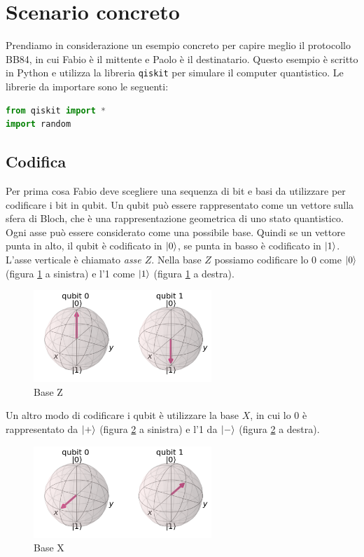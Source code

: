 \documentclass[a4paper]{article}
\begin{document}
\section{Scenario concreto}
Prendiamo in considerazione un esempio concreto per capire meglio il protocollo BB84,
in cui Fabio è il mittente e Paolo è il destinatario. Questo esempio è scritto in Python
e utilizza la libreria \texttt{qiskit} per simulare il computer quantistico. Le librerie
da importare sono le seguenti:
\begin{lstlisting}[language=Python]
from qiskit import *
import random
\end{lstlisting}

\subsection{Codifica}
Per prima cosa Fabio deve scegliere una sequenza di bit e basi da utilizzare per
codificare i bit in qubit. Un qubit può essere rappresentato come un vettore sulla sfera
di Bloch, che è una rappresentazione geometrica di uno stato quantistico. Ogni asse
può essere considerato come una possibile base. Quindi se un vettore punta in alto, il
qubit è codificato in $\ket{0}$, se punta in basso è codificato in $\ket{1}$. L'asse
verticale è chiamato \textit{asse \( Z \)}. Nella base \( Z \) possiamo codificare 
lo 0 come $\ket{0}$ (figura \ref{fig:base_z} a sinistra) e l'1 come $\ket{1}$
(figura \ref{fig:base_z} a destra).
\begin{figure}[H]
  \centering
  \includegraphics[width=0.6\textwidth]{base_z}
  \caption{Base Z}\label{fig:base_z}
\end{figure}
Un altro modo di codificare i qubit è utilizzare la base \( X \), in cui lo 0 è
rappresentato da $\ket{+}$ (figura \ref{fig:base_x} a sinistra) e l'1 da $\ket{-}$
(figura \ref{fig:base_x} a destra).
\begin{figure}[H]
  \centering
  \includegraphics[width=0.6\textwidth]{base_x}
  \caption{Base X}\label{fig:base_x}
\end{figure}
\end{document}
